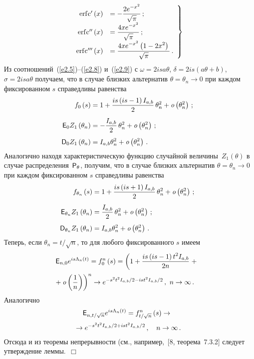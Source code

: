 \begin{multicols}{2}
\noindent
\begin{equation}
\left.
\begin{array}{rl}
\mathrm{erf}{\rm c}'\left(x\right)&=-\displaystyle\frac{\displaystyle 2e^{-x^{2}}\mathstrut}{\displaystyle \sqrt{\pi}\mathstrut}\,;\\
\mathrm{erf}{\rm c}''\left(x\right) &=\displaystyle\frac{\displaystyle 4xe^{-x^{2}}\mathstrut}{\displaystyle \sqrt{\pi}\mathstrut}\,;\\
\mathrm{erf}{\rm c}'''\left(x\right)&=\displaystyle\frac{\displaystyle 4xe^{-x^{2}}
\left(1-2x^{2}\right)\mathstrut}{\displaystyle \sqrt{\pi}\mathstrut}\,. 
\end{array}
\right \}
\label{e2.9}
\end{equation}
Из соотношений~(\ref{e2.5})--(\ref{e2.8}) и~(\ref{e2.9}) с $\omega=2isa\theta$,
$\delta=2is\left(a\theta + b\right)$,
$\sigma=2isa\theta$ получаем, что  в случае близких альтернатив
$\theta=\theta_{n} \to 0$ при каждом фиксированном
$s$ справедливы равенства
\begin{align*}
f_{0}\left(s\right)&=1+\fr{is\left(is-1\right)I_{a,b}}{2}
\,\theta_{n}^{2}+{\it o}\left(\theta_{n}^{2} \right)\,; %
\\[2pt]
{\e}_{0} Z_{1}\left(\theta_{n}\right) &=
-\fr{I_{a,b}}{2}\,\theta_{n}^{2}+{\it o} \left(\theta_{n}^{2} \right)\,; %
\\[2pt]
{\D}_{0}Z_{1}\left(\theta_{n} \right) &=
I_{a,b}\theta_{n}^{2}+{\it o}\left(\theta_{n}^{2} \right)\,. %
\end{align*}
Аналогично находя характеристическую функцию случайной величины~$Z_{1}\left(\theta \right)$ в
случае распределения~${{\sf P}}_{\theta}$, получим, что в случае близких
альтернатив $\theta =\theta_{n} \to 0$ при каждом фиксированном
$s$ справедливы равенства
\begin{align*}
f_{\theta_{n}}\left(s\right) &=1+\fr{is\left(is+1\right)
I_{a,b}}{2}\,\theta_{n}^{2}+{\it o}\left(\theta_{n}^{2}\right)\,; %
\\[2pt]
{\e}_{\theta_{n} }Z_{1}\left(\theta_{n}\right) &=
\fr{I_{a,b}}{2}\,\theta_{n}^{2}+{\it o}\left(\theta_{n}^{2}\right)\,; %
\\[2pt]
{\D}_{\theta_{n}}Z_{1}
\left(\theta_{n}\right) &=I_{a,b}\theta_{n}^{2}
+{\it o}\left(\theta_{n}^{2}\right)\,. %
\end{align*}
Теперь, если $\theta_{n}=t/\sqrt{n}$, то для любого
фиксированного $s$ имеем
\begin{multline*}
{{\sf E}}_{n,0}e^{is\Lambda_{n}\left(t\right)}=f_{0}^{n}
\left(s\right)=\left(1+\displaystyle\frac{\displaystyle is\left(is-1\right)t^{2}I_{a,b}\mathstrut}{\displaystyle 2n\mathstrut}\;+\right.{}\\[2pt]
\!\!\!\!\!\!\left.{}+ {\it o}\left(\displaystyle\frac{\displaystyle 1\mathstrut}{\displaystyle n\mathstrut} \right)\right)^{n}\to
e^{-s^{2} t^{2} I_{a,b}/2-ist^{2}I_{a,b}/2}\,,\  n\to \infty\,. 
\end{multline*}
Аналогично
\begin{multline*}
{{\sf E}}_{n,t/\sqrt{n} }e^{is\Lambda_{n}\left(t\right)}
=f_{t/\sqrt{n}}^{n}\left(s\right)\to{}\\[2pt]
{}\to
e^{-s^{2} t^{2}
I_{a,b}/2+ist^{2}I_{a,b}/2}\,,\quad n\to \infty\,.
\end{multline*}
Отсюда и из теоремы непрерывности (см., например,~[8, теорема~7.3.2] следует утверждение 
лем\-мы.~$\Box$


\end{multicols}
